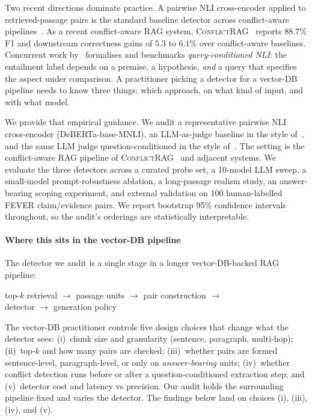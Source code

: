 \documentclass[sigconf, nonacm, natbib]{acmart}
\begin{document}
Two recent directions dominate practice. A pairwise NLI cross-encoder applied to
retrieved-passage pairs is the standard baseline detector across conflict-aware
pipelines~\citep{conflictrag2025,madamrag2025,contradetect2025}. As a recent
conflict-aware RAG system, \textsc{ConflictRAG}~\citep{conflictrag2025} reports
$88.7\%$ F1 and downstream correctness gains of $5.3$ to $6.1\%$ over conflict-aware
baselines.
Concurrent work by~\citet{canby2025qnli} formalises and benchmarks \emph{query-conditioned
NLI}: the entailment label depends on a premise, a hypothesis, \emph{and} a query that
specifies the aspect under comparison. A practitioner picking a detector for a
vector-DB pipeline needs to know three things: which approach, on what kind of input,
and with what model.

We provide that empirical guidance. We audit a representative pairwise NLI cross-encoder
(DeBERTa-base-MNLI), an LLM-as-judge baseline in the style
of~\citet{contradetect2025}, and the same LLM judge question-conditioned in the style
of~\citet{canby2025qnli}. The setting is the conflict-aware RAG pipeline of
\textsc{ConflictRAG}~\citep{conflictrag2025} and adjacent systems. We evaluate the three
detectors across a curated probe set, a 10-model LLM sweep, a small-model
prompt-robustness ablation, a long-passage realism study, an answer-bearing scoping
experiment, and external validation on 100 human-labelled FEVER claim/evidence pairs.
We report bootstrap 95\% confidence intervals throughout, so the audit's orderings are
statistically interpretable.

\paragraph{Where this sits in the vector-DB pipeline}
The detector we audit is a single stage in a longer vector-DB-backed RAG pipeline:
\begin{center}\small
top-$k$ retrieval $\to$ passage units $\to$ pair construction $\to$\\
detector $\to$ generation policy
\end{center}
The vector-DB practitioner controls five design choices that change what the detector
sees: (i)~chunk size and granularity (sentence, paragraph, multi-hop); (ii)~top-$k$ and
how many pairs are checked; (iii)~whether pairs are formed sentence-level,
paragraph-level, or only on \emph{answer-bearing} units; (iv)~whether conflict detection
runs before or after a question-conditioned extraction step; and (v)~detector cost and
latency vs precision. Our audit holds the surrounding pipeline fixed and varies the
detector. The findings below land on choices (i), (iii), (iv), and (v).
\end{document}

